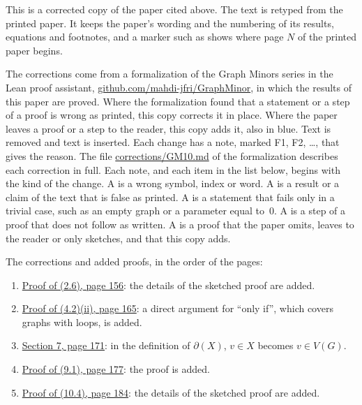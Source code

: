 
This is a corrected copy of the paper cited above. The text is retyped from the printed paper.
It keeps the paper's wording and the numbering of its results, equations and footnotes, and a
marker such as  shows where page $N$ of the printed paper begins.

The corrections come from a formalization of the Graph Minors series in the Lean proof
assistant, \href{https://github.com/mahdi-jfri/GraphMinor}{github.com/mahdi-jfri/GraphMinor},
in which the results of this paper are proved. Where the formalization found that a statement
or a step of a proof is wrong as printed, this copy corrects it in place. Where the paper leaves a proof or a step to the reader, this copy adds it, also in blue. Text  is removed and text  is inserted. Each change has a note, marked
\textcolor{fixcolor}{\sffamily F1}, \textcolor{fixcolor}{\sffamily F2}, \dots, that gives the
reason. The file
\href{https://github.com/mahdi-jfri/GraphMinor/blob/main/corrections/GM10.md}{corrections/GM10.md}
of the formalization describes each correction in full. Each note, and each item in the list below, begins with the kind of the change. A  is a wrong symbol, index or word. A  is a result or a claim of the text that is false as printed. A  is a statement that fails only in a trivial case, such as an empty graph or a parameter equal to~$0$. A  is a step of a proof that does not follow as written. A  is a proof that the paper omits, leaves to the reader or only sketches, and that this copy adds.

The corrections and added proofs, in the order of the pages:
\begin{enumerate}\setlength{\itemsep}{1pt}
\item {}\hyperref[fix:2.6-proof-added]{Proof of (2.6), page 156}: the details of the sketched proof are added.
\item {}\hyperref[fix:4.2-proof]{Proof of (4.2)(ii), page 165}: a direct argument for ``only if'', which covers graphs with loops, is added.
\item {}\hyperref[fix:7-boundary]{Section 7, page 171}: in the definition of $\partial(X)$, $v\in X$ becomes $v\in V(G)$.
\item {}\hyperref[fix:9.1-proof-added]{Proof of (9.1), page 177}: the proof is added.
\item {}\hyperref[fix:10.4-proof-added]{Proof of (10.4), page 184}: the details of the sketched proof are added.
\end{enumerate}
